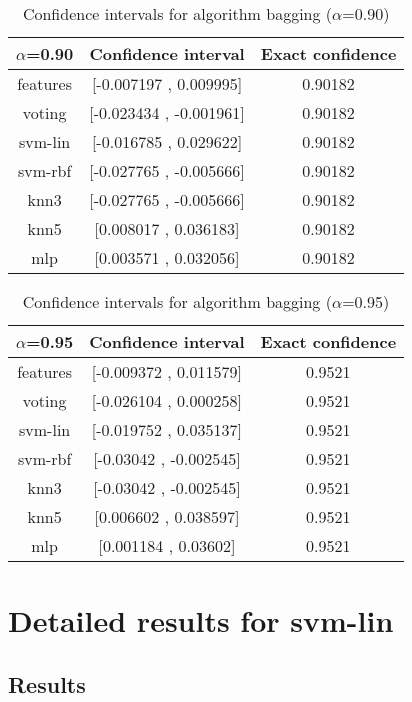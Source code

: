 \documentclass[a4paper,10pt]{article}
\begin{document}
\begin{table}[!htp]
\centering\small
\begin{tabular}{
|c|c|c|}
\hline
 $\alpha$=0.90 & Confidence interval & Exact confidence \\ \hline 
features & [-0.007197 , 0.009995] & 0.90182\\ \hline 
voting & [-0.023434 , -0.001961] & 0.90182\\ \hline 
svm-lin & [-0.016785 , 0.029622] & 0.90182\\ \hline 
svm-rbf & [-0.027765 , -0.005666] & 0.90182\\ \hline 
knn3 & [-0.027765 , -0.005666] & 0.90182\\ \hline 
knn5 & [0.008017 , 0.036183] & 0.90182\\ \hline 
mlp & [0.003571 , 0.032056] & 0.90182\\ \hline 

\end{tabular}
\caption{Confidence intervals for algorithm bagging ($\alpha$=0.90)}
\end{table}
\begin{table}[!htp]
\centering\small
\begin{tabular}{
|c|c|c|}
\hline
 $\alpha$=0.95 & Confidence interval & Exact confidence \\ \hline 
features & [-0.009372 , 0.011579] & 0.9521\\ \hline 
voting & [-0.026104 , 0.000258] & 0.9521\\ \hline 
svm-lin & [-0.019752 , 0.035137] & 0.9521\\ \hline 
svm-rbf & [-0.03042 , -0.002545] & 0.9521\\ \hline 
knn3 & [-0.03042 , -0.002545] & 0.9521\\ \hline 
knn5 & [0.006602 , 0.038597] & 0.9521\\ \hline 
mlp & [0.001184 , 0.03602] & 0.9521\\ \hline 

\end{tabular}
\caption{Confidence intervals for algorithm bagging ($\alpha$=0.95)}
\end{table}

 \clearpage 


\section{Detailed results for svm-lin}


\subsection{Results}
\end{document}
